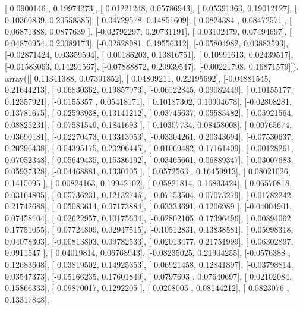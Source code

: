\documentclass{article}
\begin{document}
       [ 0.0900146 ,  0.19974273],
       [ 0.01221248,  0.05786943],
       [ 0.05391363,  0.19012127],
       [ 0.10360839,  0.20558385],
       [ 0.04729578,  0.14851609],
       [-0.0824384 ,  0.08472571],
       [ 0.06871388,  0.0877639 ],
       [-0.02792297,  0.20731191],
       [ 0.03102479,  0.07494697],
       [ 0.04870954,  0.20089173],
       [-0.02828981,  0.19556312],
       [-0.05804982,  0.03883593],
       [-0.02871424,  0.03359594],
       [ 0.00186203,  0.13816751],
       [ 0.10991613,  0.02439517],
       [-0.01583063,  0.14291567],
       [-0.07888872,  0.20939547],
       [-0.00221798,  0.16871579]]), array([[ 0.11341388,  0.07391852],
       [ 0.04809211,  0.22195692],
       [-0.04881545,  0.21644213],
       [ 0.06830362,  0.19857973],
       [-0.06122845,  0.09082449],
       [ 0.10155177,  0.12357921],
       [-0.0155357 ,  0.05418171],
       [ 0.10187302,  0.10904678],
       [-0.02808281,  0.13781675],
       [-0.02593938,  0.13141212],
       [-0.03745637,  0.05585482],
       [-0.05921564,  0.08825231],
       [-0.07581549,  0.1841693 ],
       [ 0.10307734,  0.08458008],
       [-0.00765674,  0.03690181],
       [-0.02270473,  0.13313053],
       [-0.03304261,  0.20343694],
       [-0.07530637,  0.20296438],
       [-0.04395175,  0.20206445],
       [ 0.01069482,  0.17161409],
       [-0.00128261,  0.07052348],
       [-0.05649435,  0.15386192],
       [ 0.03465661,  0.06889347],
       [-0.03007683,  0.05937328],
       [-0.04468881,  0.1330105 ],
       [ 0.0572563 ,  0.16459913],
       [ 0.08021026,  0.1415095 ],
       [-0.00824163,  0.19942102],
       [ 0.05821814,  0.16893424],
       [ 0.06570818,  0.03164805],
       [-0.05736231,  0.12132746],
       [-0.07153504,  0.07073279],
       [-0.01782242,  0.21742688],
       [ 0.05083614,  0.07173884],
       [ 0.03333691,  0.1206989 ],
       [-0.04004901,  0.07458104],
       [ 0.02622957,  0.10175604],
       [-0.02802105,  0.17396496],
       [ 0.00894062,  0.17751055],
       [ 0.07724809,  0.02947515],
       [-0.10512831,  0.13838581],
       [ 0.05998318,  0.04078303],
       [-0.00813803,  0.09782533],
       [ 0.02013477,  0.21751999],
       [ 0.06302897,  0.0911547 ],
       [ 0.04019814,  0.06768943],
       [-0.08235025,  0.21904255],
       [-0.0576388 ,  0.12683608],
       [ 0.03819502,  0.14925353],
       [ 0.06921458,  0.12841897],
       [-0.03798814,  0.03547373],
       [-0.05166235,  0.17601849],
       [ 0.0797693 ,  0.07640697],
       [ 0.02102084,  0.15866333],
       [-0.09870017,  0.1292205 ],
       [ 0.0208005 ,  0.08144212],
       [ 0.0823076 ,  0.13317848],
\end{document}
